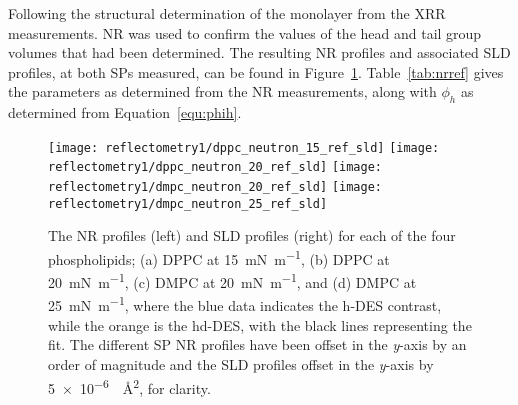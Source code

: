 Following the structural determination of the monolayer from the XRR measurements.
NR was used to confirm the values of the head and tail group volumes that had been determined.
The resulting NR profiles and associated SLD profiles, at both SPs measured, can be found in Figure~\ref{fig:nrref}.
Table~\ref{tab:nrref} gives the parameters as determined from the NR measurements, along with $\phi_h$ as determined from Equation~\ref{equ:phih}.
%
\begin{figure}
\forcerectofloat
    \centering
    \texttt{[image: reflectometry1/dppc\_neutron\_15\_ref\_sld]}
    \texttt{[image: reflectometry1/dppc\_neutron\_20\_ref\_sld]}
    \texttt{[image: reflectometry1/dmpc\_neutron\_20\_ref\_sld]}
    \texttt{[image: reflectometry1/dmpc\_neutron\_25\_ref\_sld]}
    \caption{The NR profiles (left) and SLD profiles (right) for each of the four phospholipids; (a) DPPC at \SI{15}{\milli\newton\per\meter}, (b) DPPC at \SI{20}{\milli\newton\per\meter}, (c) DMPC at \SI{20}{\milli\newton\per\meter}, and (d) DMPC at \SI{25}{\milli\newton\per\meter}, where the blue data indicates the h-DES contrast, while the orange is the hd-DES, with the black lines representing the fit. The different SP NR profiles have been offset in the \emph{y}-axis by an order of magnitude and the SLD profiles offset in the \emph{y}-axis by \SI{5e-6}{\per\angstrom\squared}, for clarity.}
    \label{fig:nrref}
\end{figure}
%
%
